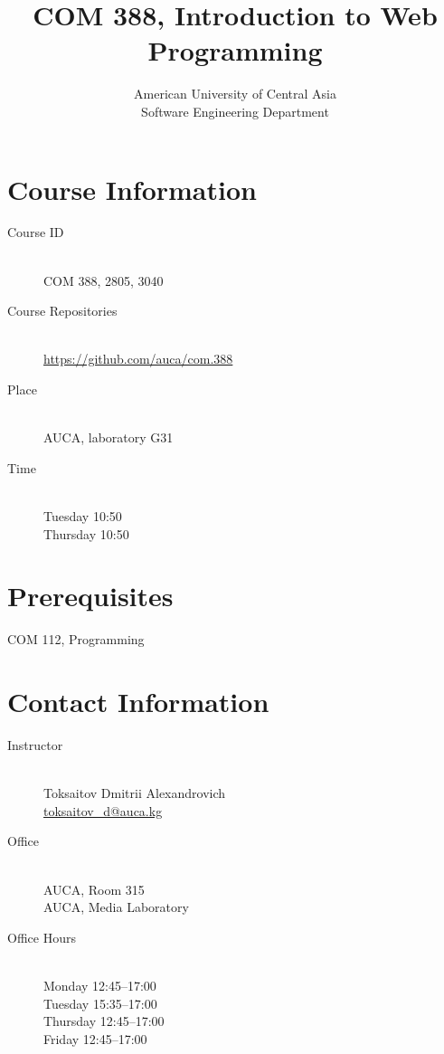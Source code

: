 \documentclass[12pt,a4paper,oneside]{article}
\newcommand{\R}[1]{\uppercase\expandafter{\romannumeral #1\relax}}
\begin{document}
    \title{COM 388, Introduction to Web Programming}
    \author{
        American University of Central Asia\\
        Software Engineering Department
    }
    \date{}
    \maketitle

    \section{Course Information}

        \begin{description}
            \item[Course ID]\hfill\\
                COM 388, 2805, 3040
            \item[Course Repositories]\hfill\\
                \url{https://github.com/auca/com.388}
            \item[Place]\hfill\\
                AUCA, laboratory G31
            \item[Time]\hfill\\
                Tuesday 10:50\\
                Thursday 10:50
        \end{description}

    \section{Prerequisites}

        COM 112, Programming \R{2}

    \section{Contact Information}

        \begin{description}
            \item[Instructor]\hfill\\
                Toksaitov Dmitrii Alexandrovich\\
                \href{mailto:toksaitov_d@auca.kg}{toksaitov\_d@auca.kg}
            \item[Office]\hfill\\
                AUCA, Room 315\\
                AUCA, Media Laboratory
            \item[Office Hours]\hfill\\
                Monday 12:45--17:00\\
                Tuesday 15:35--17:00\\
                Thursday 12:45--17:00\\
                Friday 12:45--17:00
        \end{description}
\end{document}
